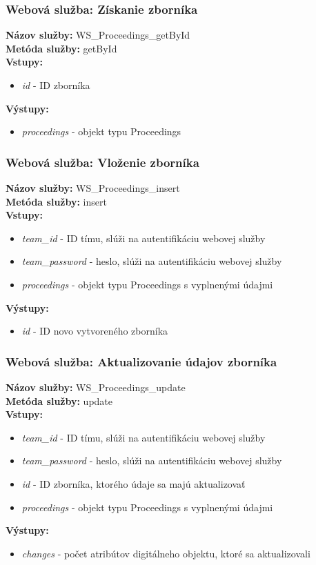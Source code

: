 \documentclass[10pt,oneside,slovak,a4paper]{article}
\begin{document}
\subsubsection{Webová služba: Získanie zborníka}
\textbf{Názov služby:} WS\_Proceedings\_getById\\
\textbf{Metóda služby:} getById\\
\textbf{Vstupy:}
	\begin{itemize}
		\item \textit{id} - ID zborníka
	\end{itemize}
\textbf{Výstupy:}
	\begin{itemize}
		\item \textit{proceedings} - objekt typu Proceedings
	\end{itemize}
	
\subsubsection{Webová služba: Vloženie zborníka}
\textbf{Názov služby:} WS\_Proceedings\_insert\\
\textbf{Metóda služby:} insert\\
\textbf{Vstupy:}
	\begin{itemize}
		\item \textit{team\_id} - ID tímu, slúži na autentifikáciu webovej služby
		\item \textit{team\_password} - heslo, slúži na autentifikáciu webovej služby
		\item \textit{proceedings} - objekt typu Proceedings s vyplnenými údajmi
	\end{itemize}
\textbf{Výstupy:}
	\begin{itemize}
		\item \textit{id} - ID novo vytvoreného zborníka
	\end{itemize}
	
\subsubsection{Webová služba: Aktualizovanie údajov zborníka}
\textbf{Názov služby:} WS\_Proceedings\_update\\
\textbf{Metóda služby:} update\\
\textbf{Vstupy:}
	\begin{itemize}
		\item \textit{team\_id} - ID tímu, slúži na autentifikáciu webovej služby
		\item \textit{team\_password} - heslo, slúži na autentifikáciu webovej služby
		\item \textit{id} - ID zborníka, ktorého údaje sa majú aktualizovať
		\item \textit{proceedings} - objekt typu Proceedings s vyplnenými údajmi
	\end{itemize}
\textbf{Výstupy:}
	\begin{itemize}
		\item \textit{changes} - počet atribútov digitálneho objektu, ktoré sa aktualizovali
	\end{itemize}
	
\end{document}
